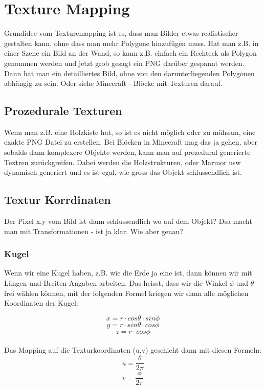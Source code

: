 \chapter{Texture Mapping}
Grundidee vom Texturemapping ist es, dass man Bilder etwas realistischer gestalten kann, ohne dass man mehr Polygone hinzufügen muss. Hat man z.B. in einer Szene ein Bild an der Wand, so kann z.B. einfach ein Rechteck als Polygon genommen werden und jetzt grob gesagt ein PNG darüber gespannt werden. Dann hat man ein detailliertes Bild, ohne von den darunterliegenden Polygonen abhängig zu sein. Oder siehe Minecraft - Blöcke mit Texturen darauf.

\section{Prozedurale Texturen}
Wenn man z.B. eine Holzkiste hat, so ist es nicht möglich oder zu mühsam, eine exakte PNG Datei zu erstellen. Bei Blöcken in Minecraft mag das ja gehen, aber sobalds dann komplexere Objekte werden, kann man auf prozedural generierte Textren zurückgreifen. Dabei werden die Holzstrukturen, oder Marmor usw dynamisch generiert und es ist egal, wie gross das Objekt schlussendlich ist.

\section{Textur Korrdinaten}
Der Pixel x,y vom Bild ist dann schlussendlich wo auf dem Objekt? Dsa macht man mit Transformationen - ist ja klar. Wie aber genau?
\subsection{Kugel}
Wenn wir eine Kugel haben, z.B. wie die Erde ja eine ist, dann können wir mit Längen und Breiten Angaben arbeiten. Das heisst, dass wir die Winkel \(\phi\) und \(\theta\) frei wählen können, mit der folgenden Formel kriegen wir dann alle möglichen Koordinaten der Kugel:

\begin{displaymath}
x = r\cdot cos \theta \cdot  sin \phi
\end{displaymath}
\begin{displaymath}
y = r\cdot sin \theta \cdot  cos \phi
\end{displaymath}
\begin{displaymath}
z = r\cdot cos\phi
\end{displaymath}\\
Das Mapping auf die Texturkoordinaten (u,v) geschieht dann mit diesen Formeln:
\begin{displaymath}
u = \frac{\theta}{2\pi}
\end{displaymath}
\begin{displaymath}
v = \frac{\phi}{2\pi}
\end{displaymath}
